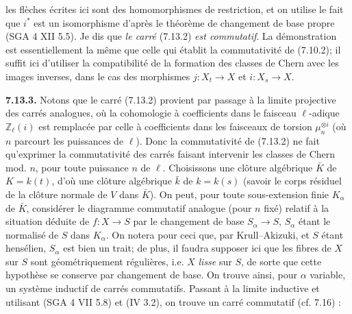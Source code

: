 
les
flèches écrites ici sont des homomorphismes de restriction, et on utilise le fait que \(i^*\) est un isomorphisme d'après le théorème de changement de base propre (SGA 4 XII 5.5). Je dis que \emph{le carré} (7.13.2) \emph{est commutatif}. La démonstration est essentiellement la même que celle qui établit la commutativité de (7.10.2); il suffit ici d'utiliser la compatibilité de la formation des classes de Chern avec les images inverses, dans le cas des morphismes \(j:X_t\to X\) et \(i:X_s\to X\).

\textbf{7.13.3.} Notons que le carré (7.13.2) provient par passage à la limite projective des carrés analogues, où la cohomologie à coefficients dans le faisceau \(\ell\)-adique \(\mathbb Z_\ell(i)\) est remplacée par celle à coefficients dans les faisceaux de torsion \(\mu_n^{\otimes i}\) (où \(n\) parcourt les puissances de \(\ell\)). Donc la commutativité de (7.13.2) ne fait qu'exprimer la commutativité des carrés faisant intervenir les classes de Chern mod. \(n\), pour toute puissance \(n\) de \(\ell\). Choisissons une clôture algébrique \(\bar K\) de \(K=k(t)\), d'où une clôture algébrique \(\bar k\) de \(k=k(s)\) (savoir le corps résiduel de la clôture normale de \(V\) dans \(\bar K\)). On peut, pour toute sous-extension finie \(K_\alpha\) de \(\bar K\), considérer le diagramme commutatif analogue (pour \(n\) fixé) relatif à la situation déduite de \(f:X\to S\) par le changement de base \(S_\alpha\to S\), \(S_\alpha\) étant le normalisé de \(S\) dans \(K_\alpha\). On notera pour ceci que, par Krull--Akizuki, et \(S\) étant hensélien, \(S_\alpha\) est bien un trait; de plus, il faudra supposer ici que les fibres de \(X\) sur \(S\) sont géométriquement régulières, i.e. \(X\) \emph{lisse} sur \(S\), de sorte que cette hypothèse se conserve par changement de base. On trouve ainsi, pour \(\alpha\) variable, un système inductif de carrés commutatifs. Passant à la limite inductive et utilisant (SGA 4 VII 5.8) et (IV 3.2), on trouve un carré commutatif (cf. 7.16) :
